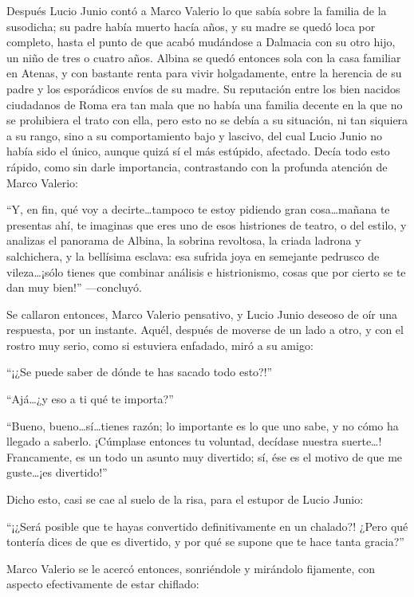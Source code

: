 \documentclass[11pt,openany]{book}
\begin{document}
Después Lucio Junio contó a Marco Valerio lo que sabía sobre la familia de la susodicha; su padre había muerto hacía años, y su madre se quedó loca por completo, hasta el punto de que acabó mudándose a Dalmacia con su otro hijo, un niño de tres o cuatro años. Albina se quedó entonces sola con la casa familiar en Atenas, y con bastante renta para vivir holgadamente, entre la herencia de su padre y los esporádicos envíos de su madre. Su reputación entre los bien nacidos ciudadanos de Roma era tan mala que no había una familia decente en la que no se prohibiera el trato con ella, pero esto no se debía a su situación, ni tan siquiera a su rango, sino a su comportamiento bajo y lascivo, del cual Lucio Junio no había sido el único, aunque quizá sí el más estúpido, afectado. Decía todo esto rápido, como sin darle importancia, contrastando con la profunda atención de Marco Valerio: 

“Y, en fin, qué voy a decirte\dots tampoco te estoy pidiendo gran cosa\dots mañana te presentas ahí, te imaginas que eres uno de esos histriones de teatro, o del estilo, y analizas el panorama de Albina, la sobrina revoltosa, la criada ladrona y salchichera, y la bellísima esclava: esa sufrida joya en semejante pedrusco de vileza\dots ¡sólo tienes que combinar análisis e histrionismo, cosas que por cierto se te dan muy bien!” —concluyó. 

Se callaron entonces, Marco Valerio pensativo, y Lucio Junio deseoso de oír una respuesta, por un instante. Aquél, después de moverse de un lado a otro, y con el rostro muy serio, como si estuviera enfadado, miró a su amigo: 

“¡¿Se puede saber de dónde te has sacado todo esto?!” 

“Ajá\dots ¿y eso a ti qué te importa?”  

“Bueno, bueno\dots sí\dots tienes razón; lo importante es lo que uno sabe, y no cómo ha llegado a saberlo. ¡Cúmplase entonces tu voluntad, decídase nuestra suerte\dots! Francamente, es un todo un asunto muy divertido; sí, ése es el motivo de que me guste\dots ¡es divertido!” 

Dicho esto, casi se cae al suelo de la risa, para el estupor de Lucio Junio: 

“¡¿Será posible que te hayas convertido definitivamente en un chalado?! ¿Pero qué tontería dices de que es divertido, y por qué se supone que te hace tanta gracia?” 

Marco Valerio se le acercó entonces, sonriéndole y mirándolo fijamente, con aspecto efectivamente de estar chiflado: 
\end{document}
